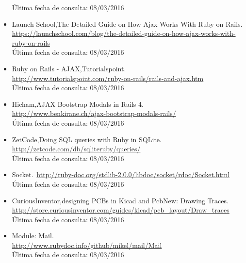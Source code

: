\begin{itemize}
	Última fecha de consulta: 	 08/03/2016
\item Launch School,The Detailed Guide on How Ajax Works With Ruby on Rails.\\
	 \href{url}{https://launchschool.com/blog/the-detailed-guide-on-how-ajax-works-with-ruby-on-rails}\\
	Última fecha de consulta: 	 08/03/2016
\item Ruby on Rails - AJAX,Tutorialspoint.\\
	 \href{url}{http://www.tutorialspoint.com/ruby-on-rails/rails-and-ajax.htm}\\
	Última fecha de consulta: 	 08/03/2016
\item Hicham,AJAX Bootstrap Modals in Rails 4.\\
	 \href{url}{http://www.benkirane.ch/ajax-bootstrap-modals-rails/}\\
	Última fecha de consulta: 	 08/03/2016
\item ZetCode,Doing SQL queries with Ruby in SQLite.\\
	 \href{url}{http://zetcode.com/db/sqliteruby/queries/}\\
	 	Última fecha de consulta: 08/03/2016
\item Socket.\ \href{url}{http://ruby-doc.org/stdlib-2.0.0/libdoc/socket/rdoc/Socket.html}\\
	Última fecha de consulta: 	08/03/2016
\item CuriousInventor,designing PCBs in Kicad and PcbNew: Drawing Traces.\\
	 \href{url}{http://store.curiousinventor.com/guides/kicad/pcb\_layout/Draw\_traces}\\
	Última fecha de consulta: 	 08/03/2016
\item Module: Mail.\\	
	\href{url}{http://www.rubydoc.info/github/mikel/mail/Mail}\\
	Última fecha de consulta: 	08/03/2016
\end{itemize}

